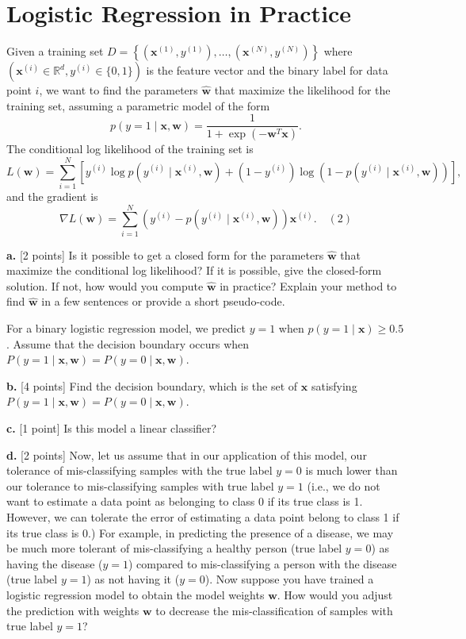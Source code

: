 \documentclass[a3paper,12pt]{extarticle} %
\begin{document}
\section{Logistic Regression in Practice}
Given a training set \( D = \left\{ \left( \mathbf{x}^{(1)}, y^{(1)} \right), \dots, \left( \mathbf{x}^{(N)}, y^{(N)} \right) \right\} \) where \( \left( \mathbf{x}^{(i)} \in \mathbb{R}^d, y^{(i)} \in \{0, 1\} \right) \) is the feature vector and the binary label for data point \( i \), we want to find the parameters \( \hat{\mathbf{w}} \) that maximize the likelihood for the training set, assuming a parametric model of the form
\[
p(y = 1 \mid \mathbf{x}, \mathbf{w}) = \frac{1}{1 + \exp(-\mathbf{w}^T \mathbf{x})}.
\]
The conditional log likelihood of the training set is
\[
L(\mathbf{w}) = \sum_{i=1}^N \left[ y^{(i)} \log p\left( y^{(i)} \mid \mathbf{x}^{(i)}, \mathbf{w} \right) + \left( 1 - y^{(i)} \right) \log \left( 1 - p\left( y^{(i)} \mid \mathbf{x}^{(i)}, \mathbf{w} \right) \right) \right],
\]
and the gradient is
\[
\nabla L(\mathbf{w}) = \sum_{i=1}^N \left( y^{(i)} - p\left( y^{(i)} \mid \mathbf{x}^{(i)}, \mathbf{w} \right) \right) \mathbf{x}^{(i)}. \quad (2)
\]

\noindent \textbf{a.} [2 points] Is it possible to get a closed form for the parameters \( \hat{\mathbf{w}} \) that maximize the conditional log likelihood? If it is possible, give the closed-form solution. If not, how would you compute \( \hat{\mathbf{w}} \) in practice? Explain your method to find \( \hat{\mathbf{w}} \) in a few sentences or provide a short pseudo-code.

For a binary logistic regression model, we predict \( y = 1 \) when \( p(y = 1 \mid \mathbf{x}) \geq 0.5 \). Assume that the decision boundary occurs when \( P(y = 1 \mid \mathbf{x}, \mathbf{w}) = P(y = 0 \mid \mathbf{x}, \mathbf{w}) \).

\noindent \textbf{b.} [4 points] Find the decision boundary, which is the set of $\mathbf{x}$ satisfying $P(y = 1 \mid \mathbf{x}, \mathbf{w}) = P(y = 0 \mid \mathbf{x}, \mathbf{w})$.

\noindent \textbf{c.} [1 point] Is this model a linear classifier?

\noindent \textbf{d.} [2 points] Now, let us assume that in our application of this model, our tolerance of mis-classifying samples with the true label $y = 0$ is much lower than our tolerance to mis-classifying samples with true label $y = 1$ (i.e., we do not want to estimate a data point as belonging to class 0 if its true class is 1. However, we can tolerate the error of estimating a data point belong to class 1 if its true class is 0.) For example, in predicting the presence of a disease, we may be much more tolerant of mis-classifying a healthy person (true label $y = 0$) as having the disease ($y = 1$) compared to mis-classifying a person with the disease (true label $y = 1$) as not having it ($y = 0$). Now suppose you have trained a logistic regression model to obtain the model weights $\mathbf{w}$. How would you adjust the prediction with weights $\mathbf{w}$ to decrease the mis-classification of samples with true label $y = 1$?
\end{document}
